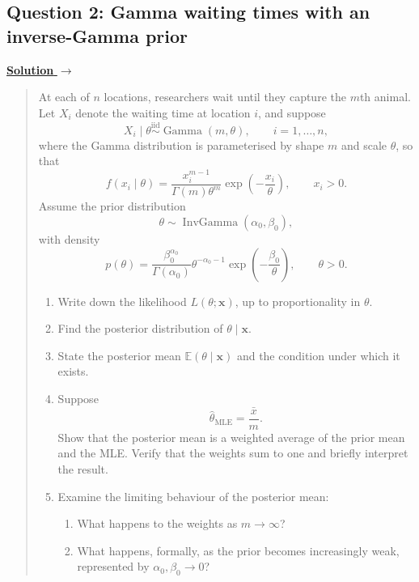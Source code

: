 \documentclass[11pt,a4paper]{article}
\newcommand{\given}{\mathrel{|}}
\newcommand{\xvec}{\boldsymbol{x}}
\DeclareMathOperator{\InvGamma}{InvGamma}
\newcommand{\E}{\mathbb{E}}
\newenvironment{examquestion}[2]
  {\subsection{#1}\label{question:\arabic{subsection}}\label{#2}%
   \noindent\hyperref[answer:\arabic{subsection}]{\textbf{Solution} $\rightarrow$}%
   \begin{quote}\color{statgrey}}
  {\end{quote}}
\begin{document}
\clearpage

\begin{examquestion}{Question 2: Gamma waiting times with an inverse-Gamma prior}{question:practice-gamma-waiting-times-with-an-inverse-gamma-prior}
At each of $n$ locations, researchers wait until they capture the $m$th
animal. Let $X_i$ denote the waiting time at location $i$, and suppose
\[
  X_i\given\theta
  \overset{\mathrm{iid}}{\sim}\operatorname{Gamma}(m,\theta),
  \qquad i=1,\ldots,n,
\]
where the Gamma distribution is parameterised by shape $m$ and scale
$\theta$, so that
\[
  f(x_i\given\theta)
  =\frac{x_i^{m-1}}{\Gamma(m)\theta^m}
   \exp\left(-\frac{x_i}{\theta}\right),
  \qquad x_i>0.
\]
Assume the prior distribution
\[
  \theta\sim\InvGamma(\alpha_0,\beta_0),
\]
with density
\[
  p(\theta)
  =\frac{\beta_0^{\alpha_0}}{\Gamma(\alpha_0)}
   \theta^{-\alpha_0-1}
   \exp\left(-\frac{\beta_0}{\theta}\right),
  \qquad \theta>0.
\]

\begin{enumerate}[label=(\alph*)]
  \item Write down the likelihood $L(\theta;\xvec)$, up to proportionality
        in $\theta$.

  \item Find the posterior distribution of $\theta\given\xvec$.

  \item State the posterior mean $\E(\theta\given\xvec)$ and the condition
        under which it exists.

  \item Suppose
        \[
          \widehat{\theta}_{\mathrm{MLE}}=\frac{\bar{x}}{m}.
        \]
        Show that the posterior mean is a weighted average of the prior mean
        and the MLE. Verify that the weights sum to one and briefly interpret
        the result.

  \item Examine the limiting behaviour of the posterior mean:
        \begin{enumerate}[label=(\roman*)]
          \item What happens to the weights as $m\to\infty$?
          \item What happens, formally, as the prior becomes increasingly
                weak, represented by $\alpha_0,\beta_0\to0$?
        \end{enumerate}
\end{enumerate}
\end{examquestion}
\end{document}
